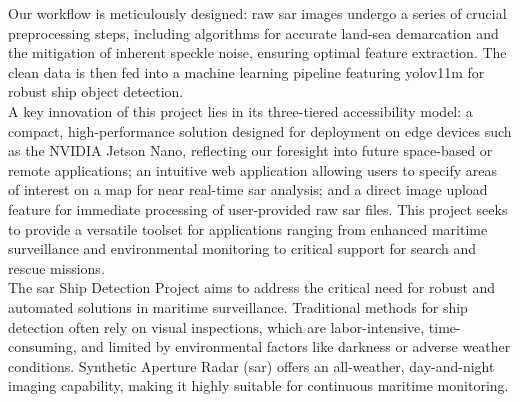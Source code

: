\documentclass{article}
\begin{document}
Our workflow is meticulously designed: raw \acrshort{sar} images undergo a series of crucial preprocessing steps, including algorithms for accurate land-sea demarcation and the mitigation of inherent speckle noise, ensuring optimal feature extraction. The clean data is then fed into a machine learning pipeline featuring \acrshort{yolov11m} for robust ship object detection. \\

A key innovation of this project lies in its three-tiered accessibility model: a compact, high-performance solution designed for deployment on edge devices such as the NVIDIA Jetson Nano, reflecting our foresight into future space-based or remote applications; an intuitive web application allowing users to specify areas of interest on a map for near real-time \acrshort{sar} analysis; and a direct image upload feature for immediate processing of user-provided raw \acrshort{sar} files. This project seeks to provide a versatile toolset for applications ranging from enhanced maritime surveillance and environmental monitoring to critical support for search and rescue missions.\\

The \acrshort{sar} Ship Detection Project aims to address the critical need for robust and automated solutions in maritime surveillance. Traditional methods for ship detection often rely on visual inspections, which are labor-intensive, time-consuming, and limited by environmental factors like darkness or adverse weather conditions. Synthetic Aperture Radar (\acrshort{sar}) offers an all-weather, day-and-night imaging capability, making it highly suitable for continuous maritime monitoring.\\
\end{document}
